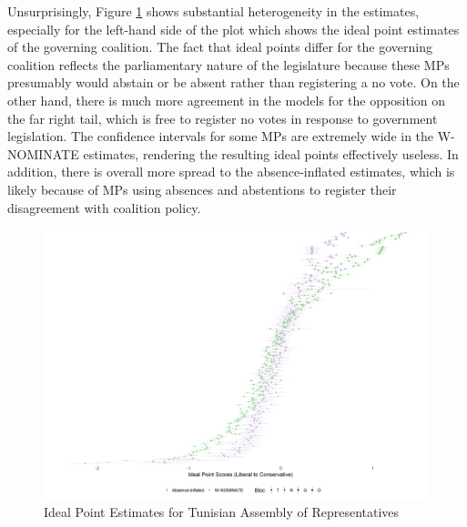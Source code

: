 	Unsurprisingly, Figure \ref{tunis_ideal} shows substantial heterogeneity in the estimates, especially for the left-hand side of the plot which shows the ideal point estimates of the governing coalition. The fact that ideal points differ for the governing coalition reflects the parliamentary nature of the legislature because these MPs presumably would abstain or be absent rather than registering a no vote. On the other hand, there is much more agreement in the models for the opposition on the far right tail, which is free to register no votes in response to government legislation. The confidence intervals for some MPs are extremely wide in the W-NOMINATE estimates, rendering the resulting ideal points effectively useless. In addition, there is overall more spread to the absence-inflated estimates, which is likely because of MPs using absences and abstentions to register their disagreement with coalition policy.
	\begin{figure}
		\centering
		\caption{Ideal Point Estimates for Tunisian Assembly of Representatives}\label{tunis_ideal}
		\includegraphics[width=\linewidth]{tunisia_arp_compare}
	\end{figure}

